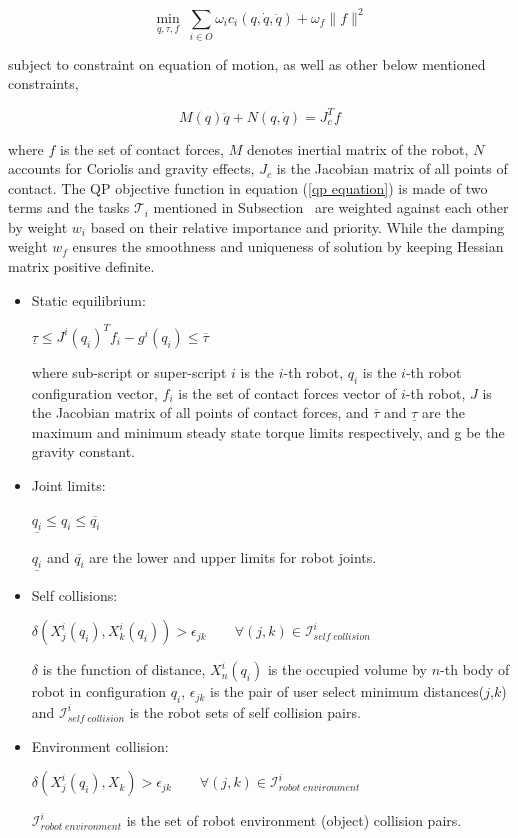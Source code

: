 \documentclass[a4paper, 12pt, oneside]{Thesis}  %
\begin{document}
\begin{equation}\label{qp equation}
\min_{\ddot{q},\tau,f} \; \sum_{i\in O} \omega_i c_i(q,\dot{q},\ddot{q}) + \omega_{f}\lVert f\rVert^2
\end{equation}

subject to constraint on equation of motion, as well as other below mentioned constraints,

\begin{equation}
	M(q)\ddot{q} + N(q,\dot{q}) =  J_c^T f
\end{equation}

where $f$ is the set of contact forces, $M$ denotes inertial matrix of the robot, $N$ accounts for Coriolis  and gravity effects, $J_c$ is the Jacobian matrix of all points of contact. The QP objective function in equation (\ref{qp equation}) is made of two terms and the tasks $\mathscr{T}_i$ mentioned in Subsection~ are weighted against each other by weight $w_i$ based on their relative importance and priority. While the damping weight $w_f$ ensures the smoothness and uniqueness of solution by keeping Hessian matrix positive definite.

\begin{itemize}	
	\item Static equilibrium:

	$\underline{\tau} \leq J^i(q_i)^Tf_i - g^i(q_i) \leq \overline{\tau}$
	
	where sub-script or super-script $i$ is the $i$-th robot, $q_i$ is the $i$-th robot configuration vector, $f_i$ is the set of contact forces vector of $i$-th robot, $J$ is the Jacobian matrix of all points of contact forces, and $\overline{\tau}$ and $\underline{\tau}$ are the maximum and minimum steady state torque limits respectively, and g be the gravity constant.
	
	\item Joint limits:
	
	$\underline{q_i} \leq q_i \leq \overline{q_i}$
	
	$\underline{q_i}$ and $\overline{q_i}$ are the lower and upper limits for robot joints.
	
	\item Self collisions:
	
	$\delta(X^i_j(q_i), X^i_k(q_i)) > \epsilon_{jk} \qquad \forall(j,k)\in {\mathscr{I}}^i_{self\; collision}$
	
	$\delta$ is the function of distance, $X^i_n(q_i)$ is the occupied volume by $n$-th body of robot in configuration $q_i$, $\epsilon_{jk}$ is the pair of user select minimum distances($j$,$k$) and ${\mathscr{I}}^i_{self\;collision}$ is the robot sets of self collision pairs.
	
	\item Environment collision:
	
	$\delta(X^i_j(q_i), X_k) > \epsilon_{jk} \qquad \forall(j,k)\in {\mathscr{I}}^i_{robot\;environment}$
	
	${\mathscr{I}}^i_{robot\;environment}$ is the set of robot environment (object) collision pairs.
	
\end{itemize}
\end{document}
